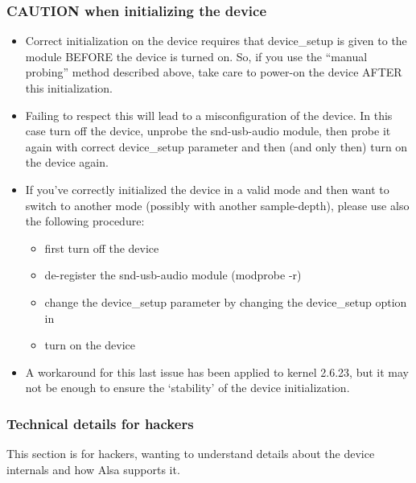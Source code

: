 \documentclass[a4paper,8pt,english]{sphinxmanual}
\begin{document}
\subsubsection{CAUTION when initializing the device}
\label{sound/cards/audiophile-usb:caution-when-initializing-the-device}\begin{itemize}
\item {} 
Correct initialization on the device requires that device\_setup is given to
the module BEFORE the device is turned on. So, if you use the ``manual probing''
method described above, take care to power-on the device AFTER this initialization.

\item {} 
Failing to respect this will lead to a misconfiguration of the device. In this case
turn off the device, unprobe the snd-usb-audio module, then probe it again with
correct device\_setup parameter and then (and only then) turn on the device again.

\item {} 
If you've correctly initialized the device in a valid mode and then want to switch
to  another mode (possibly with another sample-depth), please use also the following
procedure:
\begin{itemize}
\item {} 
first turn off the device

\item {} 
de-register the snd-usb-audio module (modprobe -r)

\item {} 
change the device\_setup parameter by changing the device\_setup
option in 

\item {} 
turn on the device

\end{itemize}

\item {} 
A workaround for this last issue has been applied to kernel 2.6.23, but it may not
be enough to ensure the `stability' of the device initialization.

\end{itemize}


\subsubsection{Technical details for hackers}
\label{sound/cards/audiophile-usb:technical-details-for-hackers}
This section is for hackers, wanting to understand details about the device
internals and how Alsa supports it.
\end{document}
